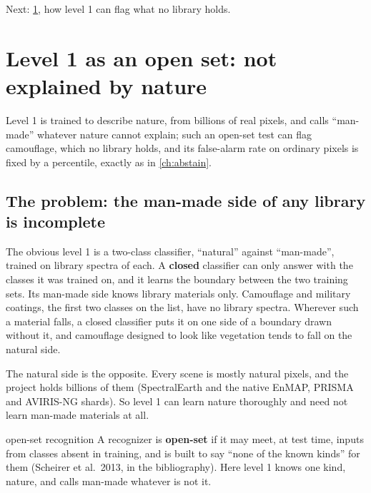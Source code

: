 \documentclass[11pt,a4paper,oneside,openany]{book}
\newcommand{\nextchapter}[1]{\par\medskip\noindent\hfill\textsf{\small Next: #1}\par}
\begin{document}
\nextchapter{\cref{ch:openset}, how level 1 can flag what no library holds.}
\chapter{Level 1 as an open set: not explained by nature}
\label{ch:openset}

\begin{onething}
Level 1 is trained to describe nature, from billions of real pixels, and calls ``man-made'' whatever nature cannot explain; such an open-set test can flag camouflage,
which no library holds, and its false-alarm rate on ordinary pixels is fixed by a percentile, exactly as in \cref{ch:abstain}.
\end{onething}

\section{The problem: the man-made side of any library is incomplete}

The obvious level 1 is a two-class classifier, ``natural'' against ``man-made'', trained on library spectra of each. A \textbf{closed} classifier can only
answer with the classes it was trained on, and it learns the boundary between the two training sets. Its man-made side knows library materials only. Camouflage and
military coatings, the first two classes on the list, have no library spectra. Wherever such a material falls, a closed classifier puts it on one side of a boundary
drawn without it, and camouflage designed to look like vegetation tends to fall on the natural side.

The natural side is the opposite. Every scene is mostly natural pixels, and the project holds billions of them (SpectralEarth and the native EnMAP, PRISMA and AVIRIS-NG
shards). So level 1 can learn nature thoroughly and need not learn man-made materials at all.

\begin{defn}{open-set recognition}
A recognizer is \textbf{open-set} if it may meet, at test time, inputs from classes absent in training, and is built to say ``none of the known kinds'' for
them (Scheirer et al.~2013, in the bibliography). Here level 1 knows one kind, nature, and calls man-made whatever is not it.
\end{defn}
\end{document}
